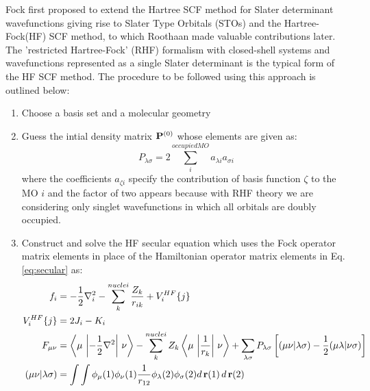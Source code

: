             Fock first proposed to extend the Hartree SCF method for Slater determinant wavefunctions giving rise to Slater Type Orbitals (STOs) and the Hartree-Fock(HF) SCF method$\allowbreak$, to which Roothaan \cite{Roothaan1951} made valuable contributions later. The 'restricted Hartree-Fock' (RHF) formalism with closed-shell systems and wavefunctions represented as a single Slater determinant is the typical form of the HF SCF method. The procedure to be followed using this approach is outlined below:
            \begin{enumerate}
                \item Choose a basis set and a molecular geometry
                \item Guess the intial density matrix ${\mathbf {P}}^{(0)}$ whose elements are given as:
                    \begin{equation}\label{eq:density matrix elements}
                        P_{\lambda \sigma} = 2 \displaystyle\sum_i^{occupied MO} a_{\lambda i} a_{\sigma i}
                    \end{equation}
                    where the coefficients $a_{\zeta i}$ specify the contribution of basis function $\zeta$ to the MO $i$ and the factor of two appears because with RHF theory we are considering only singlet wavefunctions in which all orbitals are doubly occupied.
                \item Construct and solve the HF secular equation which uses the Fock operator matrix elements in place of the Hamiltonian operator matrix elements in Eq. \eqref{eq:secular} as:
                    \begin{equation}\label{eq:one electron Fock matrix elements}
                        \begin{aligned}
                            f_i &= -\frac{1}{2} \nabla^2_i - \displaystyle\sum_k^{nuclei} \frac{Z_k}{r_{ik}} + V_i^{HF} \{j\}\\
                            V_i^{HF} \{j\} &= 2 J_i - K_i\\
                            F_{\mu \nu} &= \left< \mu \,\left| -\frac{1}{2} \nabla^2 \right|\,\nu \right> - \displaystyle\sum_k^{nuclei} Z_k \left< \mu \,\left| \frac{1}{r_k} \right| \, \nu \right> + \displaystyle\sum_{\lambda \sigma} P_{\lambda \sigma} \left[ (\mu \nu | \lambda \sigma) - \frac{1}{2} (\mu \lambda | \nu \sigma) \right]\\
                            (\mu \nu | \lambda \sigma) &= \displaystyle\int \int \phi_\mu (1) \phi_\nu(1) \frac{1}{r_{12}}\phi_\lambda (2) \phi_\sigma (2) d\,\mbf{r}(1)\,d\,\mbf{r}(2)

\end{aligned}
\end{equation}
\end{enumerate}
